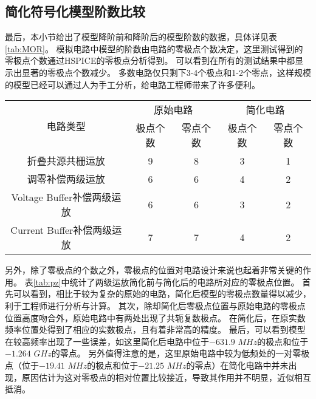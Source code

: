 \subsection{简化符号化模型阶数比较}
\label{subsec:simp:res:order}

最后，本小节给出了模型降阶前和降阶后的模型阶数的数据，具体详见表\ref{tab:MOR}。
模拟电路中模型的阶数由电路的零极点个数决定，这里测试得到的零极点个数通过HSPICE的零极点分析得到。
可以看到在所有的测试结果中都显示出显著的零极点个数减少。
多数电路仅只剩下3-4个极点和1-2个零点，这样规模的模型已经可以通过人为手工分析，给电路工程师带来了许多便利。

\begin{table}[!htbp]
	\centering
	\begin{tabular}{c|c|c|c|c}
		\hline
		\multirow{2}{*}{电路类型} & \multicolumn{2}{c|}{原始电路} & \multicolumn{2}{c}{简化电路} \\ \cline{2-5}
		                      & 极点个数 &        零点个数        & 极点个数 &       零点个数        \\ \hline
		      折叠共源共栅运放        &  9   &         8          &  3   &         1         \\
		      调零补偿两级运放        &  6   &         6          &  4   &         2         \\
		Voltage Buffer补偿两级运放  &  6   &         6          &  3   &         2         \\
		Current Buffer补偿两级运放  &  7   &         7          &  4   &         2         \\ \hline
	\end{tabular}
\end{table}

另外，除了零极点的个数之外，零极点的位置对电路设计来说也起着非常关键的作用。
表\ref{tab:pz}中统计了两级运放简化前与简化后的电路所对应的零极点位置。
首先可以看到，相比于较为复杂的原始的电路，简化后模型的零极点数量得以减少，利于工程师进行分析与计算。
其次，除却简化后零极点位置与原始电路的零极点位置高度吻合外，原始电路中有两处出现了共轭复数极点。
在简化后，在原实数频率位置处得到了相应的实数极点，且有着非常高的精度。
最后，可以看到模型在较高频率出现了一些误差，如这里简化后电路中位于$-631.9$ $MHz$的极点和位于$-1.264$ $GHz$的零点。
另外值得注意的是，这里原始电路中较为低频处的一对零极点（位于$-19.41$ $MHz$的极点和位于$-21.25$ $MHz$的零点）在简化电路中并未出现，原因估计为这对零极点的相对位置比较接近，导致其作用并不明显，近似相互抵消。

